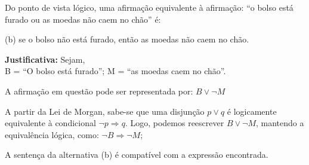 \documentclass[12pt,letterpaper, onecolumn]{exam}
\begin{document}
\begin{questions}
\begin{solution}
    \end{solution}

    \pagebreak
    
    \question[q9] Do ponto de vista lógico, uma afirmação equivalente à afirmação: “o bolso está furado ou as moedas não caem no chão” é: 
    

    \begin{solution}
        (b) se o bolso não está furado, então as moedas não caem no chão.

        \textbf{Justificativa:} Sejam, \\[0.5em]
            B = “O bolso está furado”;  \hfill
            M = “as moedas caem no chão”.

        A afirmação em questão pode ser representada por: \( B \vee \neg M \)

        A partir da Lei de Morgan, sabe-se que uma disjunção \( p \vee q \) é logicamente equivalente à condicional \( \neg p \Rightarrow q \).
        Logo, podemos reescrever \( B \vee \neg M \), mantendo a equivalência lógica, como: \( \neg B \Rightarrow \neg M \);
        
        A sentença da alternativa (b) é compatível com a expressão encontrada.


\end{solution}
\end{questions}
\end{document}

